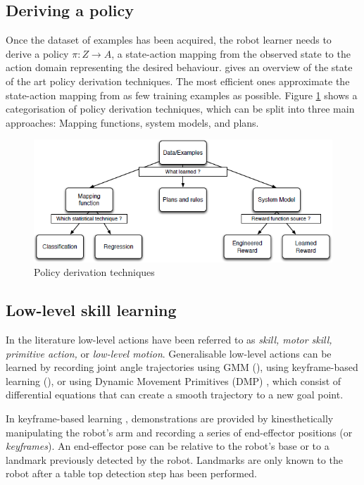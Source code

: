 \subsection{Deriving a policy}\label{subsec:Deriving a policy}
Once the dataset of examples has been acquired, the robot learner needs to derive a policy $\pi : Z \rightarrow A$, a state-action mapping from the observed state to the action domain representing the desired behaviour. 
\cite{chernova2014robot} gives an overview of the state of the art policy derivation techniques.
The most efficient ones approximate the state-action mapping from as few training examples as possible.
Figure \ref{fig:Learning-techniques} \cite{argall2009survey} shows a categorisation of policy derivation techniques, which can be split into three main approaches: Mapping functions, system models, and plans.

  \begin{figure}[!h]
    \centering
    \includegraphics[scale=0.75]{figures/Learning-techniques}
    \caption{Policy derivation techniques}
    \label{fig:Learning-techniques}
  \end{figure}

\subsection{Low-level skill learning}
In the literature low-level actions have been referred to as \textit{skill, motor skill, primitive action,} or \textit{low-level motion}.\cite{chernova2014robot}
Generalisable low-level actions can be learned by recording joint angle trajectories using GMM (\cite{billard2008robot}), using keyframe-based learning (\cite{akgun2012keyframe}), or using Dynamic Movement Primitives (DMP) \cite{pastor2009learning}, which consist of differential equations that can create a smooth trajectory to a new goal point.

In keyframe-based learning \cite{akgun2012keyframe}, demonstrations are provided by kinesthetically manipulating the robot's arm and recording a series of end-effector positions (or \textit{keyframes}). 
An end-effector pose can be relative to the robot's base or to a landmark previously detected by the robot.
Landmarks are only known to the robot after a table top detection step has been performed.

